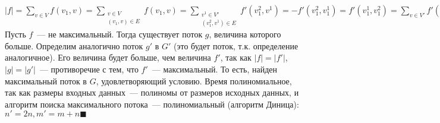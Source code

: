 \documentclass[a4paper]{article}
\begin{document}
\begin{enumerate}
$|f|={\sum\limits_{v\in V}f(v_1,v)}={\sum\limits_{\substack{v\in V\\(v_1,v)\in E}}f(v_1,v)}=
{\sum\limits_{\substack{v^1\in V'\\(v^2_1,v^1)\in E}}f'(v^2_1,v^1)}=-f'(v^2_1,v^1_1)=f'(v^1_1,v^2_1)={\sum\limits_{v\in V'}f'(v^1_1,v)}=|f'|$\newline
Пусть $f$~--- не максимальный. Тогда существует поток $g$, величина которого больше. Определим аналогично поток $g'$ в $G'$ (это будет поток, т.к. определение аналогичное). Его величина будет больше, чем величина $f'$, так как $|f|=|f'|$, $|g|=|g'|$~--- противоречие с тем, что $f'$~--- максимальный.\newline
То есть, найден максимальный поток в $G$, удовлетворяющий условию.\newline
Время полиномиальное, так как размеры входных данных~--- полиномы от размеров исходных данных, и алгоритм поиска максимального потока~--- полиномиальный (алгоритм Диница):
$n'=2n,m'=m+n$$\blacksquare$
\end{enumerate}
\end{document}
